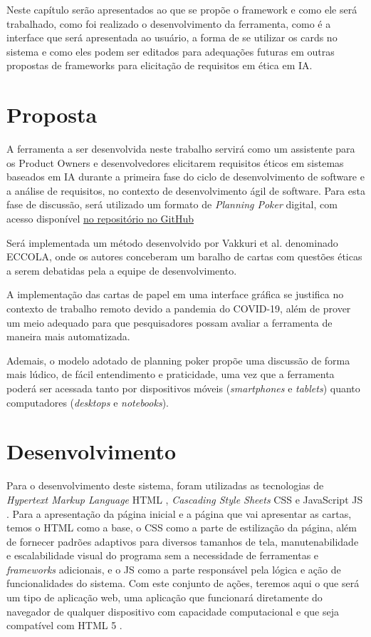 \label{desenvolvimento}

Neste capítulo serão apresentados ao que se propõe o framework e como ele será trabalhado, como foi realizado o desenvolvimento da ferramenta, como é a interface que será apresentada ao usuário, a forma de se utilizar os cards no sistema e como eles podem ser editados para adequações futuras em outras propostas de frameworks para elicitação de requisitos em ética em \acrshort{IA}.

\section{Proposta}

A ferramenta a ser desenvolvida neste trabalho servirá como um assistente para os Product Owners e desenvolvedores elicitarem requisitos éticos em sistemas baseados em IA durante a primeira fase do ciclo de desenvolvimento de software e a análise de requisitos, no contexto de desenvolvimento ágil de software. Para esta fase de discussão, será utilizado um formato de \textit{Planning Poker} digital, com acesso disponível \href{https://oggvaldo.github.io/eccola}{no repositório no GitHub}

Será implementada um método desenvolvido por Vakkuri et al. \cite{ECCOLA} denominado ECCOLA, onde os autores conceberam um baralho de cartas com questões éticas a serem debatidas pela a equipe de desenvolvimento.

A implementação das cartas de papel em uma interface gráfica se justifica no contexto de trabalho remoto devido a pandemia do COVID-19, além de prover um meio adequado para que pesquisadores possam avaliar a ferramenta de maneira mais automatizada.

Ademais, o modelo adotado de planning poker propõe uma discussão de forma mais lúdico, de fácil entendimento e praticidade, uma vez que a ferramenta poderá ser acessada tanto por dispositivos móveis (\textit{smartphones} e \textit{tablets}) quanto computadores (\textit{desktops} e \textit{notebooks}).

\section{Desenvolvimento}

Para o desenvolvimento deste sistema, foram utilizadas as tecnologias de \textit{Hypertext Markup Language} \acrshort{HTML} \cite{HTMLsite}, \textit{Cascading Style Sheets} \acrshort{CSS} \cite{CSSsite} e JavaScript \acrshort{JS} \cite{JavaScriptsite}. Para a apresentação da página inicial e a página que vai apresentar as cartas, temos o \acrshort{HTML} como a base, o \acrshort{CSS} como a parte de estilização da página, além de fornecer padrões adaptivos para diversos tamanhos de tela, manutenabilidade e escalabilidade visual do programa sem a necessidade de ferramentas e \textit{frameworks} adicionais, e o \acrshort{JS} como a parte responsável pela lógica e ação de funcionalidades do sistema. Com este conjunto de ações, teremos aqui o que será um tipo de aplicação web, uma aplicação que funcionará diretamente do navegador de qualquer dispositivo com capacidade computacional e que seja compatível com HTML 5 \cite{webapp}.

